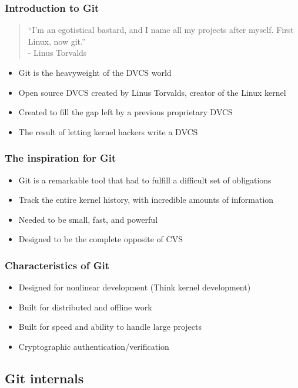 \documentclass{beamer}
\begin{document}
\begin{frame}
  \frametitle{Introduction to Git}
  \begin{quotation}
    ``I'm an egotistical bastard, and I name all my projects after myself. First Linux, now git.'' \\
    - Linus Torvalds
  \end{quotation}
  \begin{itemize}
    \item Git is the heavyweight of the DVCS world
    \item Open source DVCS created by Linus Torvalds, creator of the Linux kernel
    \item Created to fill the gap left by a previous proprietary DVCS
    \item The result of letting kernel hackers write a DVCS
  \end{itemize}
\end{frame}

\begin{frame}
  \frametitle{The inspiration for Git}
  \begin{itemize}
    \item Git is a remarkable tool that had to fulfill a difficult set of obligations
    \item Track the entire kernel history, with incredible amounts of information
    \item Needed to be small, fast, and powerful
    \item Designed to be the complete opposite of CVS
  \end{itemize}
\end{frame}

\begin{frame}
  \frametitle{Characteristics of Git}
  \begin{itemize}
    \item Designed for nonlinear development (Think kernel development)
    \item Built for distributed and offline work
    \item Built for speed and ability to handle large projects
    \item Cryptographic authentication/verification
  \end{itemize}
\end{frame}

\subsection{Git internals}
\end{document}
